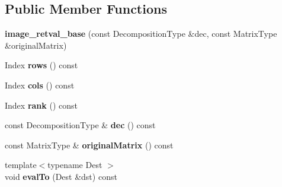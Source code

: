 \subsection*{Public Member Functions}
\begin{DoxyCompactItemize}
\item 
\mbox{\label{struct_eigen_1_1internal_1_1image__retval__base_a72c098f98f6702852f8341ee2406585f}} 
{\bfseries image\+\_\+retval\+\_\+base} (const Decomposition\+Type \&dec, const Matrix\+Type \&original\+Matrix)
\item 
\mbox{\label{struct_eigen_1_1internal_1_1image__retval__base_a37453f1615e91001e4e838293144c63f}} 
Index {\bfseries rows} () const
\item 
\mbox{\label{struct_eigen_1_1internal_1_1image__retval__base_a2f602147609d036b62b84c4257635abb}} 
Index {\bfseries cols} () const
\item 
\mbox{\label{struct_eigen_1_1internal_1_1image__retval__base_a13926ab4b6107eb6e8e6759a04c7406b}} 
Index {\bfseries rank} () const
\item 
\mbox{\label{struct_eigen_1_1internal_1_1image__retval__base_a46691a7d5e03235242acbce16cc0e78a}} 
const Decomposition\+Type \& {\bfseries dec} () const
\item 
\mbox{\label{struct_eigen_1_1internal_1_1image__retval__base_a6b7716d833c63bdd9b9625ee869e93d7}} 
const Matrix\+Type \& {\bfseries original\+Matrix} () const
\item 
\mbox{\label{struct_eigen_1_1internal_1_1image__retval__base_ad324e0d8a20369d3cdf61104227ed230}} 
{\footnotesize template$<$typename Dest $>$ }\\void {\bfseries eval\+To} (Dest \&dst) const
\end{DoxyCompactItemize}
